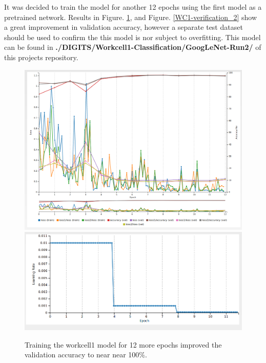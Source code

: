\documentclass[10pt,journal,compsoc]{IEEEtran}
\begin{document}
It was decided to train the model for another 12 epochs using the first model as a pretrained network. Results in Figure. \ref{WC1-acc-loss_2}, and Figure. \ref{WC1-verification_2} show a great improvement in validation accuracy, however a separate test dataset should be used to confirm the this model is nor subject to overfitting.  This model can be found in \textbf{ ./DIGITS/Workcell1-Classification/GoogLeNet-Run2/} of this projects repository.

\begin{figure}[thpb]
  \centering
  \includegraphics[width=\linewidth]{../img/Workcell1-Classification/Run2/WC1-2-Loss_accuracy.png} \\
  \includegraphics[width=\linewidth]{../img/Workcell1-Classification/Run2/WC1-2-LR.png}
  \caption{Training the workcell1 model for 12 more epochs improved the  validation accuracy to near near 100\%.}
  \label{WC1-acc-loss_2}
\end{figure}
\end{document}
